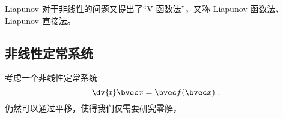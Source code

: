 
Liapunov 对于非线性的问题又提出了“V 函数法”，又称 Liapunov 函数法、Liapunov 直接法。

\subsection{非线性定常系统}
考虑一个非线性定常系统 
\begin{equation}
\dv{t} \bvec x = \bvec f(\bvec x) ~.
\end{equation}
仍然可以通过平移，使得我们仅需要研究零解，
